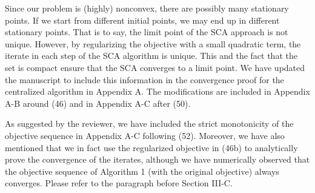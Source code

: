 \begin{enumerate}
Since our problem is (highly) nonconvex, there are possibly many stationary points. If we start from different initial points, we may end up in different stationary points. That is to say, the limit point of the \ac{SCA} approach is not unique. However, by regularizing the objective with a small quadratic term, the iterate in each step of the \ac{SCA} algorithm is unique. This and the fact that the set is compact ensure that the \ac{SCA} converges to a limit point. We have updated the manuscript to include this information in the convergence proof for the centralized algorithm in Appendix A. The modifications are included in Appendix A-B around (46) and in Appendix A-C after (50).

  

\resp As suggested by the reviewer, we have included the strict monotonicity of the objective sequence in Appendix A-C following (52). Moreover, we have also mentioned that we in fact use the regularized objective in (46b) to analytically prove the convergence of the iterates, although we have numerically observed that the objective sequence of Algorithm 1 (with the original objective) always converges. Please refer to the paragraph before Section III-C.


\end{enumerate}
